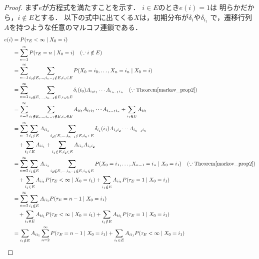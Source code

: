 \documentclass[dvipdfmx,autodetect-engine]{jsarticle}
\theoremstyle{remark}
\theoremstyle{definition}
\begin{document}
\begin{proof}
    まず$e$が方程式を満たすことを示す．
    $i \in E$のとき$e(i)=1$は
    明らかだから，$i \notin E$とする．
    以下の式中に出てくる$X$は，初期分布が$\delta_{i}$や$\delta_{i_1}$
    で，遷移行列$A$を持つような任意のマルコフ連鎖である．
    \begin{align}
        e(i) &= P(\tau_{E}<\infty \mid X_0 = i) \\
        &= \sum_{n=1}^{\infty} P(\tau_{E} = n \mid X_0 = i) \quad (\because i \notin E)\\
        &= \sum_{n=1}^{\infty} \sum_{i_0 \notin E,\ldots,i_{n-1}\notin E,i_n\in E} 
        P(X_0 = i_0,\ldots,X_n = i_n \mid X_0 = i) \\
        &= \sum_{n=1}^{\infty} \sum_{i_0 \notin E,\ldots,i_{n-1}\notin E,i_n\in E} 
        \delta_{i}(i_0)  A_{i_0 i_1}\cdots A_{i_{n-1} i_n} \quad 
        (\because \mathrm{Theorem}\ref{markov_prop2})\\
        &= \sum_{n=2}^{\infty} \sum_{i_1 \notin E,\ldots,i_{n-1}\notin E,i_n\in E} 
         A_{i i_1} A_{i_1 i_2}\cdots A_{i_{n-1} i_n} 
         + \sum_{i_{1} \in E} A_{i i_{1}} \\
        &= \sum_{n=3}^{\infty} \sum_{i_{1} \notin E} A_{i i_{1}} 
        \sum_{i_2 \notin E,\ldots,i_{n-1}\notin E,i_n\in E} 
        \delta_{i_1}(i_1) A_{i_1 i_2}\cdots A_{i_{n-1} i_n} \\
        &\quad + \sum_{i_{1} \in E} A_{i i_{1}} 
        + \sum_{i_{1} \notin E,i_{2} \in E} A_{i i_{1}} A_{i_{1} i_{2}}\\
        &= \sum_{n=3}^{\infty} \sum_{i_{1} \notin E} A_{i i_{1}}
        \sum_{i_2 \notin E,\ldots,i_{n-1}\notin E,i_n\in E} 
        P(X_0 = i_1,\ldots,X_{n-1} = i_n \mid X_0 = i_1) 
        \quad (\because \mathrm{Theorem}\ref{markov_prop2})\\
        &\quad + \sum_{i_{1} \in E} A_{i i_{1}} P(\tau_{E} <\infty \mid X_0 = i_{1})
        + \sum_{i_{1} \notin E} A_{i i_{1}} P(\tau_{E} = 1 \mid X_0 = i_{1})\\
        &= \sum_{n=3}^{\infty} \sum_{i_{1} \notin E} A_{i i_{1}} 
        P(\tau_{E} = n-1 \mid X_0 = i_1) \\
        &\quad + \sum_{i_{1} \in E} A_{i i_{1}} P(\tau_{E} <\infty \mid X_0 = i_{1})
        + \sum_{i_{1} \notin E} A_{i i_{1}} P(\tau_{E} = 1 \mid X_0 = i_{1})\\
        &= \sum_{i_{1} \notin E} A_{i i_{1}} \sum_{n=2}^{\infty} 
        P(\tau_{E} = n-1 \mid X_0 = i_1) 
        + \sum_{i_{1} \in E} A_{i i_{1}} P(\tau_{E} <\infty \mid X_0 = i_{1})\\

\end{align}
\end{proof}
\end{document}
